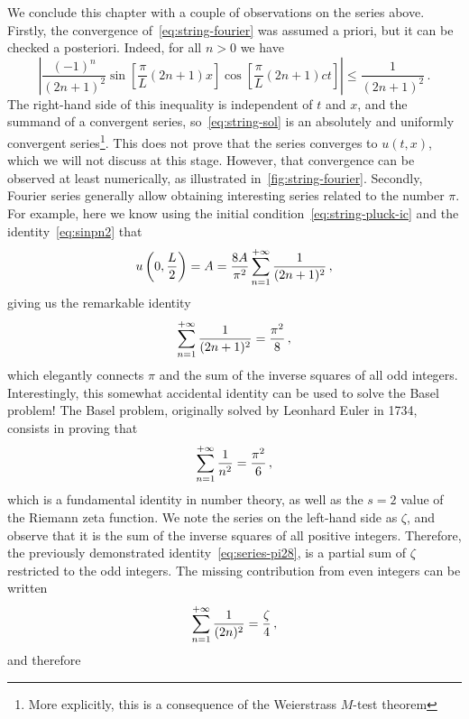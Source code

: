We conclude this chapter with a couple of observations on the series above. Firstly, the
convergence of~\cref{eq:string-fourier} was assumed a priori, but it can be checked a
posteriori. Indeed, for all $n>0$ we have
\begin{equation}
  \left|\frac{(-1)^n}{(2n+1)^2}\sin\left[\frac{\pi}{L}(2n+1)x\right]
  \cos\left[\frac{\pi}{L}(2n+1)ct\right]\right|
  \leq\frac{1}{(2n+1)^2}\,.
\end{equation}
The right-hand side of this inequality is independent of $t$ and $x$, and the summand of a
convergent series, so~\cref{eq:string-sol} is an absolutely and uniformly convergent
series\footnote{More explicitly, this is a consequence of the Weierstrass $M$-test
theorem}. This does not prove that the series converges to $u(t,x)$, which we will not
discuss at this stage. However, that convergence can be observed at least numerically, as
illustrated in~\cref{fig:string-fourier}. Secondly, Fourier series generally allow
obtaining interesting series related to the number $\pi$. For example, here we know using
the initial condition~\cref{eq:string-pluck-ic} and the identity~\cref{eq:sinpn2} that
\begin{equation}
  u\left(0,\frac{L}{2}\right)=A=\frac{8A}{\pi^2}\sum_{n=1}^{+\infty}\frac{1}{(2n+1)^2}\,,
\end{equation}
giving us the remarkable identity
\begin{equation}
  \sum_{n=1}^{+\infty}\frac{1}{(2n+1)^2}=\frac{\pi^2}{8}\,,
  \label{eq:series-pi28}
\end{equation}
which elegantly connects $\pi$ and the sum of the inverse squares of all odd integers.
Interestingly, this somewhat accidental identity can be used to solve the Basel problem!
The Basel problem, originally solved by Leonhard Euler in 1734, consists in proving that
\begin{equation}
  \sum_{n=1}^{+\infty}\frac{1}{n^2}=\frac{\pi^2}{6}\,,
\end{equation}
which is a fundamental identity in number theory, as well as the $s=2$ value of the
Riemann zeta function. We note the series on the left-hand side as $\zeta$, and observe
that it is the sum of the inverse squares of all positive integers. Therefore, the
previously demonstrated identity~\cref{eq:series-pi28}, is a partial sum of $\zeta$
restricted to the odd integers. The missing contribution from even integers can be written
\begin{equation}
  \sum_{n=1}^{+\infty}\frac{1}{(2n)^2}=\frac{\zeta}{4}\,,
\end{equation}
and therefore
